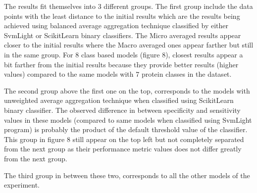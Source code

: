 
The results fit themselves into 3 different groups.
The first group include the data points with the least distance to the initial results which are the results being 
achieved using balanced average aggregation technique classified by either SvmLight or ScikitLearn binary classifiers. 
The Micro averaged results appear closer to the initial results where the Macro averaged ones appear farther but 
still in the same group. For 8 class based models (figure 8), closest results appear a bit farther from the initial 
results because they provide better results (higher values) compared to the same models with 7 protein classes 
in the dataset.

The second group above the first one on the top, corresponds to the models with unweighted average aggregation technique when classified 
using ScikitLearn binary classifier. The observed difference in between specificity and sensitivity values in these models 
(compared to same models when classified using SvmLight program) is probably the product of the default threshold value 
of the classifier. This group in figure 8 still appear on the top left but not completely separated from the next group as their 
performance metric values does not differ greatly from the next group. 

The third group in between these two, corresponds to all the other models of the experiment.






